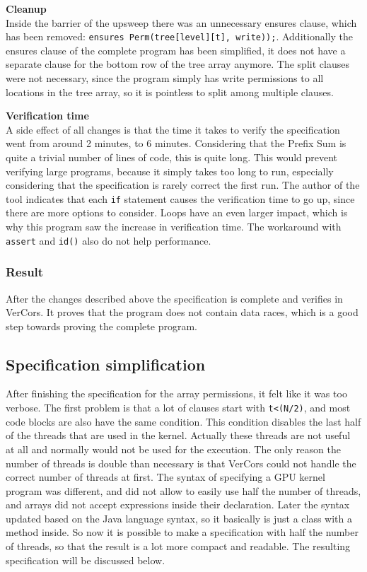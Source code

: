 \documentclass[a4paper]{article}
\newcommand{\code}[1]{\texttt{\small \color{inline}#1}} %
\begin{document}
\textbf{Cleanup}\\
Inside the barrier of the upsweep there was an unnecessary ensures clause, which has been removed: \code{ensures Perm(tree[level][t], write));}.
Additionally the ensures clause of the complete program has been simplified, it does not have a separate clause for the bottom row of the tree array anymore. The split clauses were not necessary, since the program simply has write permissions to all locations in the tree array, so it is pointless to split among multiple clauses.

\textbf{Verification time}\\
A side effect of all changes is that the time it takes to verify the specification went from around 2 minutes, to 6 minutes. Considering that the Prefix Sum is quite a trivial number of lines of code, this is quite long. This would prevent verifying large programs, because it simply takes too long to run, especially considering that the specification is rarely correct the first run. The author of the tool indicates that each \code{if} statement causes the verification time to go up, since there are more options to consider. Loops have an even larger impact, which is why this program saw the increase in verification time. The workaround with \code{assert} and \code{id()} also do not help performance.

\subsubsection{Result}
After the changes described above the specification is complete and verifies in VerCors. It proves that the program does not contain data races, which is a good step towards proving the complete program.



\subsection{Specification simplification}
After finishing the specification for the array permissions, it felt like it was too verbose. The first problem is that a lot of clauses start with \code{t<(N/2)}, and most code blocks are also have the same condition. This condition disables the last half of the threads that are used in the kernel. Actually these threads are not useful at all and normally would not be used for the execution. The only reason the number of threads is double than necessary is that VerCors could not handle the correct number of threads at first. The syntax of specifying a GPU kernel program was different, and did not allow to easily use half the number of threads, and arrays did not accept expressions inside their declaration. Later the syntax updated based on the Java language syntax, so it basically is just a class with a method inside. So now it is possible to make a specification with half the number of threads, so that the result is a lot more compact and readable. The resulting specification will be discussed below.
\end{document}
